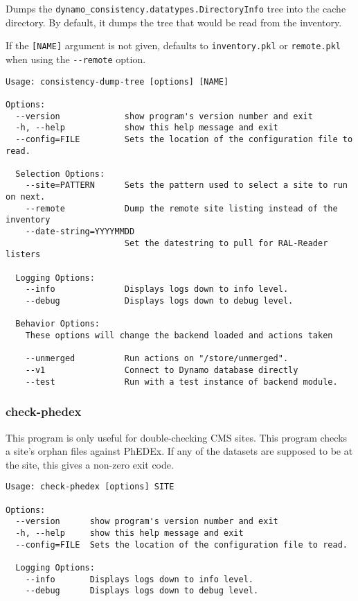 Dumps the \texttt{dynamo\_consistency.datatypes.DirectoryInfo}
tree into the cache directory.
By default, it dumps the tree that would be read from the inventory.

If the \texttt{[NAME]} argument is not given, defaults to \texttt{inventory.pkl}
or \texttt{remote.pkl} when using the \texttt{-{-}remote} option.
{\small
\begin{verbatim}
Usage: consistency-dump-tree [options] [NAME]

Options:
  --version             show program's version number and exit
  -h, --help            show this help message and exit
  --config=FILE         Sets the location of the configuration file to read.

  Selection Options:
    --site=PATTERN      Sets the pattern used to select a site to run on next.
    --remote            Dump the remote site listing instead of the inventory
    --date-string=YYYYMMDD
                        Set the datestring to pull for RAL-Reader listers

  Logging Options:
    --info              Displays logs down to info level.
    --debug             Displays logs down to debug level.

  Behavior Options:
    These options will change the backend loaded and actions taken

    --unmerged          Run actions on "/store/unmerged".
    --v1                Connect to Dynamo database directly
    --test              Run with a test instance of backend module.
\end{verbatim}
}

\subsubsection{check-phedex}

This program is only useful for double-checking CMS sites.
This program checks a site's orphan files against PhEDEx.
If any of the datasets are supposed to be at the site,
this gives a non-zero exit code.

{\small
\begin{verbatim}
Usage: check-phedex [options] SITE

Options:
  --version      show program's version number and exit
  -h, --help     show this help message and exit
  --config=FILE  Sets the location of the configuration file to read.

  Logging Options:
    --info       Displays logs down to info level.
    --debug      Displays logs down to debug level.
\end{verbatim}
}


